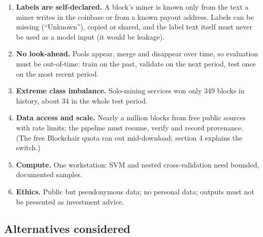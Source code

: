 \documentclass[
  11pt,
  a4paper,
]{article}
\providecommand{\tightlist}{%
  \setlength{\itemsep}{0pt}\setlength{\parskip}{0pt}}
\begin{document}
\begin{enumerate}
\def\labelenumi{\arabic{enumi}.}
\tightlist
\item
  \textbf{Labels are self-declared.} A block's miner is known only from
  the text a miner writes in the coinbase or from a known payout
  address. Labels can be missing (``Unknown''), copied or shared, and
  the label text itself must never be used as a model input (it would be
  leakage).
\item
  \textbf{No look-ahead.} Pools appear, merge and disappear over time,
  so evaluation must be out-of-time: train on the past, validate on the
  next period, test once on the most recent period.
\item
  \textbf{Extreme class imbalance.} Solo-mining services won only 349
  blocks in history, about 34 in the whole test period.
\item
  \textbf{Data access and scale.} Nearly a million blocks from free
  public sources with rate limits; the pipeline must resume, verify and
  record provenance. (The free Blockchair quota ran out mid-download;
  section 4 explains the switch.)
\item
  \textbf{Compute.} One workstation: SVM and nested cross-validation
  need bounded, documented samples.
\item
  \textbf{Ethics.} Public but pseudonymous data; no personal data;
  outputs must not be presented as investment advice.
\end{enumerate}


\subsection{Alternatives considered}\label{alternatives-considered}
\end{document}
